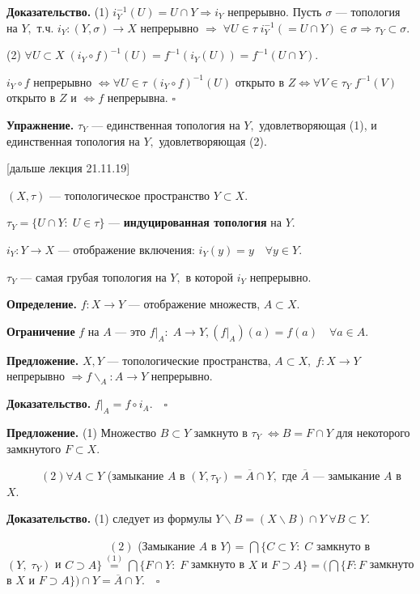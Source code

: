 \documentclass[12pt,a4paper]{article}
\begin{document}
\textbf{Доказательство.} (1) $i_{Y}^{-1}(U) = U \cap Y \Rightarrow i_{Y}$ непрерывно. Пусть $\sigma$ --- топология на $Y,$ т.ч. $i_{Y}: (Y, \sigma) \to X$ непрерывно $\Rightarrow \; \forall U \in \tau \; i_{Y}^{-1} (= U \cap Y) \in \sigma \Rightarrow \tau_{Y} \subset \sigma.$ 

(2) $\forall U \subset X \; (i_{Y} \circ f)^{-1}(U) = f^{-1}(i_{Y}(U)) = f^{-1}(U \cap Y).$

$i_{Y} \circ f$ непрерывно $\Leftrightarrow \forall U \in \tau \; (i_{Y} \circ f)^{-1}(U)$ открыто в $Z \Leftrightarrow \forall V \in \tau_{Y} \; f^{-1}(V)$ открыто в $Z$ и $\Leftrightarrow f$ непрерывна. $\square$

\textbf{Упражнение.} $\tau_{Y}$ --- единственная топология на $Y,$ удовлетворяющая (1), и единственная топология на $Y,$ удовлетворяющая (2).

[дальше лекция 21.11.19]

$(X, \tau)$ --- топологическое пространство $Y \subset X.$ 

$\tau_{Y} = \{U \cap Y: \; U \in \tau\}$ --- \textbf{индуцированная топология} на $Y.$ 

$i_{Y}: Y \to X$ --- отображение включения: $i_{Y}(y) = y \quad \forall y \in Y.$

$\tau_{Y}$ --- самая грубая топология на $Y,$ в которой $i_{Y}$ непрерывно. 

\textbf{Определение.} $f: X \to Y$ --- отображение множеств, $A \subset X.$ 

\textbf{Ограничение} $f$ на $A$ --- это $f|_{A}: \; A \to Y, (f|_{A})(a) = f(a) \quad \forall a \in A.$ 

\textbf{Предложение.} $X, Y$ --- топологические пространства, $A \subset X, \; f: X \to Y$ непрерывно $\Rightarrow f \backslash_{A}: A \to Y$ непрерывно. 

\textbf{Доказательство.} $f|_{A} = f \circ i_{A}. \quad \square$

\textbf{Предложение.} (1) Множество $B \subset Y$ замкнуто в $\tau_{Y} \; \Leftrightarrow B = F \cap Y$ для некоторого замкнутого $F \subset X.$ 

$\quad \quad \quad (2) \forall A \subset Y$ (замыкание $A$ в $(Y, \tau_{Y}) = \overline{A} \cap Y,$ где $\overline{A}$ --- замыкание $A$ в $X.$ 

\textbf{Доказательство.} (1) следует из формулы $Y \backslash B = (X \backslash B) \cap Y \; \forall B \subset Y.$ 

$\quad \quad \quad \quad \quad \quad \quad \quad \quad (2)$ (Замыкание $A$ в $Y$) = $\bigcap\{C \subset Y: \; C$ замкнуто в $(Y, \; \tau_{Y})$ и $C \supset A\} \overset{(1)}{=} \bigcap \{F \cap Y: \; F$ замкнуто в $X$ и $F \supset A\} = (\bigcap \{F: F$ замкнуто в $X$ и $F \supset A\}) \cap Y = \overline{A} \cap Y. \quad \square$ 
\end{document}
